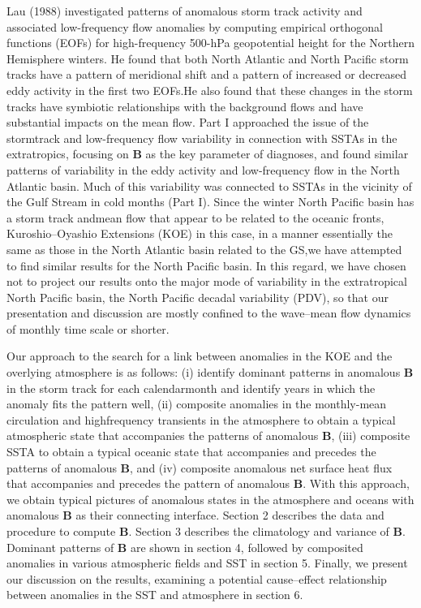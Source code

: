 \documentclass{ametsocv6.1}
\begin{document}
Lau (1988) investigated patterns of anomalous storm
track activity and associated low-frequency flow anomalies
by computing empirical orthogonal functions (EOFs)
for high-frequency 500-hPa geopotential height for the
Northern Hemisphere winters. He found that both North
Atlantic and North Pacific storm tracks have a pattern of
meridional shift and a pattern of increased or decreased
eddy activity in the first two EOFs.He also found that these
changes in the storm tracks have symbiotic relationships
with the background flows and have substantial impacts on
the mean flow. Part I approached the issue of the stormtrack
and low-frequency flow variability in connection with
SSTAs in the extratropics, focusing on $\mathbf{B}$ as the key parameter
of diagnoses, and found similar patterns of variability
in the eddy activity and low-frequency flow in the
North Atlantic basin. Much of this variability was connected
to SSTAs in the vicinity of the Gulf Stream in cold
months (Part I). Since the winter North Pacific basin has a
storm track andmean flow that appear to be related to the
oceanic fronts, Kuroshio--Oyashio Extensions (KOE) in
this case, in a manner essentially the same as those in the
North Atlantic basin related to the GS,we have attempted
to find similar results for the North Pacific basin. In this
regard, we have chosen not to project our results onto the
major mode of variability in the extratropical North Pacific
basin, the North Pacific decadal variability (PDV), so
that our presentation and discussion are mostly confined
to the wave--mean flow dynamics of monthly time scale or
shorter.


Our approach to the search for a link between anomalies
in the KOE and the overlying atmosphere is as follows:
(i) identify dominant patterns in anomalous $\mathbf{B}$ in the
storm track for each calendarmonth and identify years in
which the anomaly fits the pattern well, (ii) composite
anomalies in the monthly-mean circulation and highfrequency
transients in the atmosphere to obtain a typical
atmospheric state that accompanies the patterns of
anomalous $\mathbf B$, (iii) composite SSTA to obtain a typical
oceanic state that accompanies and precedes the patterns
of anomalous $\mathbf B$, and (iv) composite anomalous net surface
heat flux that accompanies and precedes the pattern of
anomalous $\mathbf B$. With this approach, we obtain typical pictures
of anomalous states in the atmosphere and oceans
with anomalous $\mathbf{B}$ as their connecting interface.
Section 2 describes the data and procedure to compute
$\mathbf B$. Section 3 describes the climatology and variance of $\mathbf B$.
Dominant patterns of $\mathbf B$ are shown in section 4, followed by
composited anomalies in various atmospheric fields and
SST in section 5. Finally, we present our discussion on the
results, examining a potential cause--effect relationship
between anomalies in the SST and atmosphere in section 6.
\end{document}
